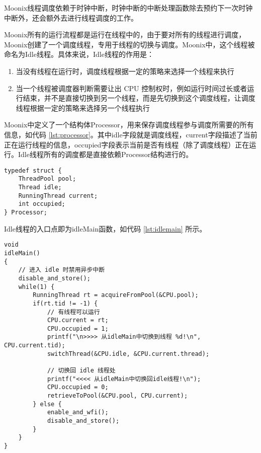 Moonix线程调度依赖于时钟中断，时钟中断的中断处理函数除去预约下一次时钟中断外，还会额外去进行线程调度的工作。

Moonix所有的运行流程都是运行在线程中的，由于要对所有的线程进行调度，Moonix创建了一个调度线程，专用于线程的切换与调度。Moonix中，这个线程被命名为Idle线程。具体来说，Idle线程的作用是：

\begin{enumerate}
	\item 当没有线程在运行时，调度线程根据一定的策略来选择一个线程来执行
	\item 当一个线程被调度器判断需要让出 CPU 控制权时，例如运行时间过长或者运行结束，并不是直接切换到另一个线程，而是先切换到这个调度线程，让调度线程根据一定的策略来选择另一个线程执行
\end{enumerate}

Moonix中定义了一个结构体Processor，用来保存调度线程参与调度所需要的所有信息，如代码 \ref{lst:processor}。其中idle字段就是调度线程，current字段描述了当前正在运行线程的信息，occupied字段表示当前是否有线程（除了调度线程）正在运行。Idle线程所有的调度都是直接依赖Processor结构进行的。

\begin{minipage}[c]{0.95\textwidth}
\begin{lstlisting}[language={moonix}, caption={Processor结构体}, label={lst:processor}]
typedef struct {
	ThreadPool pool;
	Thread idle;
	RunningThread current;
	int occupied;
} Processor;
\end{lstlisting}
\end{minipage}

Idle线程的入口点即为idleMain函数，如代码 \ref{lst:idlemain} 所示。

\begin{minipage}[c]{0.95\textwidth}
\begin{lstlisting}[language={moonix}, caption={idleMain函数}, label={lst:idlemain}]
void
idleMain()
{
	// 进入 idle 时禁用异步中断
	disable_and_store();
	while(1) {
		RunningThread rt = acquireFromPool(&CPU.pool);
		if(rt.tid != -1) {
			// 有线程可以运行
			CPU.current = rt;
			CPU.occupied = 1;
			printf("\n>>>> 从idleMain中切换到线程 %d!\n", CPU.current.tid);
			switchThread(&CPU.idle, &CPU.current.thread);
			
			// 切换回 idle 线程处
			printf("<<<< 从idleMain中切换回idle线程!\n");
			CPU.occupied = 0;
			retrieveToPool(&CPU.pool, CPU.current);
		} else {
			enable_and_wfi();
			disable_and_store();
		}
	}
}
\end{lstlisting}
\end{minipage}

